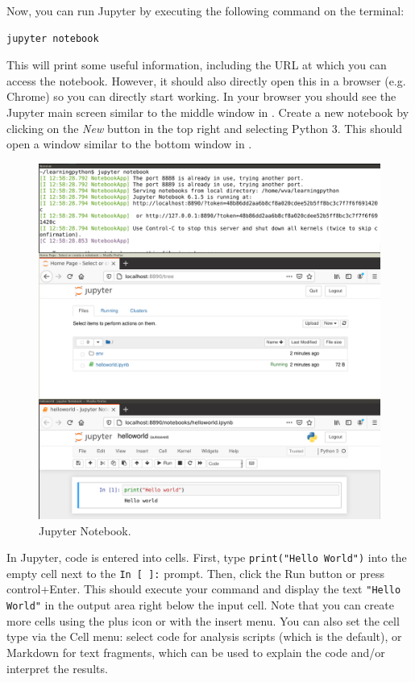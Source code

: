 Now, you can run Jupyter by executing the following command on the terminal:

\begin{verbatim}
jupyter notebook
\end{verbatim}

This will print some useful information, including the URL at which you can access the notebook.
However, it should also directly open this in a browser (e.g. Chrome) so you can directly start working. 
In your browser you should see the Jupyter main screen similar to the middle window in .
Create a new notebook by clicking on the \emph{New} button in the top right and selecting Python 3.
This should open a window similar to the bottom window in .

\begin{figure}
  \includegraphics[width=\textwidth]{figures/jupyter.png}
  \caption{Jupyter Notebook.}\label{fig:jupyter}
\end{figure}

In Jupyter, code is entered into cells.
First, type \verb|print("Hello World")| into the empty cell next to the \verb|In [ ]:| prompt.
Then, click the Run button or press control+Enter. This should execute your command and display
the text \verb|"Hello World"| in the output area right below the input cell.
Note that you can create more cells using the plus icon or with the insert menu.
You can also set the cell type via the Cell menu: select code for analysis scripts (which is the default),
or Markdown for text fragments, which can be used to explain the code and/or interpret the results.

